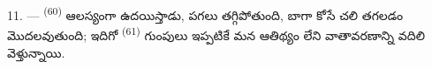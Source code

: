 11. ---  \textsuperscript{(60)} ఆలస్యంగా ఉదయిస్తాడు, పగలు తగ్గిపోతుంది,
 బాగా కోసే చలి తగలడం మొదలవుతుంది; ఇదిగో 
\textsuperscript{(61)} గుంపులు ఇప్పటికే మన ఆతిథ్యం లేని వాతావరణాన్ని వదిలి వెళ్తున్నాయి.

\VUsaut{6.0mm}
\VUfilet{22mm}
